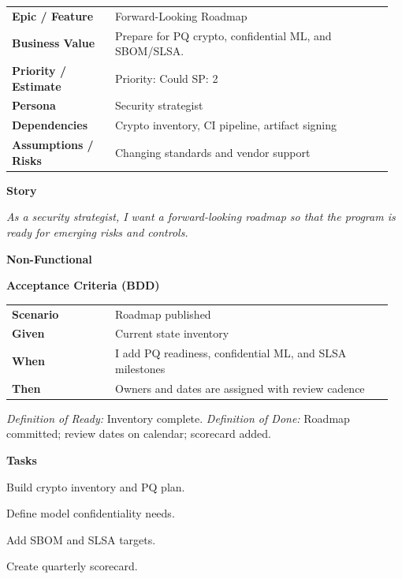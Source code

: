 \documentclass[11pt,letterpaper]{article}
\makeatletter
\newenvironment{kvtable}{%
  \par\noindent\begin{tabular}{@{}>{\raggedright\bfseries\arraybackslash}p{0.26\linewidth} >{\raggedright\arraybackslash}p{0.70\linewidth}@{}}
}{\end{tabular}\par}
\newenvironment{bdd}{%
  \par\noindent\begin{tabular}{@{}>{\raggedright\bfseries\arraybackslash}p{0.26\linewidth} >{\raggedright\arraybackslash}p{0.70\linewidth}@{}}
}{\end{tabular}\par}
\newcommand{\DoRDoD}[2]{%
  \vspace{0.35em}
  {\footnotesize\color{Muted}%
    \textit{Definition of Ready:} #1 \; \textbullet\;
    \textit{Definition of Done:} #2%
  }%
}
\newenvironment{storycard}[2]{%
  \begin{tcolorbox}[cloudcard, title={#1 --- #2}]%
}{\end{tcolorbox}}
\newcommand{\sectionlabel}[1]{\par\vspace{0.35em}\textbf{#1}\par}
\makeatother
\begin{document}
\begin{storycard}{CCS-34}{Ch. 34 — Future Directions, Risks \& Challenges}
\begin{kvtable}
Epic / Feature & Forward-Looking Roadmap\\
Business Value & Prepare for PQ crypto, confidential ML, and SBOM/SLSA.\\
Priority / Estimate & Priority: Could \quad SP: 2\\
Persona & Security strategist\\
Dependencies & Crypto inventory, CI pipeline, artifact signing\\
Assumptions / Risks & Changing standards and vendor support\\
\end{kvtable}
\sectionlabel{Story}
\textit{As a security strategist, I want a forward-looking roadmap so that the program is ready for emerging risks and controls.}
\sectionlabel{Non-Functional}\;
\sectionlabel{Acceptance Criteria (BDD)}
\begin{bdd}
Scenario & Roadmap published\\
Given & Current state inventory\\
When & I add PQ readiness, confidential ML, and SLSA milestones\\
Then & Owners and dates are assigned with review cadence\\
\end{bdd}
\DoRDoD{Inventory complete.}{Roadmap committed; review dates on calendar; scorecard added.}
\sectionlabel{Tasks}
\begin{checklist}
\item Build crypto inventory and PQ plan.
\item Define model confidentiality needs.
\item Add SBOM and SLSA targets.
\item Create quarterly scorecard.
\end{checklist}
\end{storycard}

\end{document}
